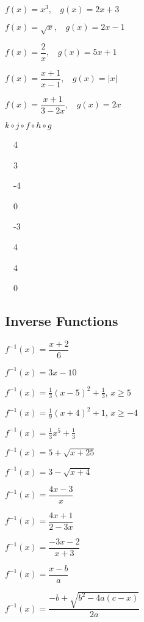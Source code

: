 \documentclass[12pt]{book}
\theoremstyle{definition}
\begin{document}
\begin{oddenumerate}
\begin{multicols}{2}
\item $f(x)=x^3,~~~~g(x)=2x+3$
\item $f(x)=\sqrt{x},~~~~g(x)=2x-1$
\item $f(x)=\dfrac{2}{x},~~~~g(x)=5x+1$
\item $f(x)=\dfrac{x+1}{x-1},~~~~g(x)=|x|$
\item $f(x)=\dfrac{x+1}{3-2x},~~~~g(x)=2x$
\item $k\circ j\circ f\circ h\circ g$
\end{multicols}
\begin{multicols}{4}
\item~~4
\item~~3
\item~~-4
\item~~0
\item~~-3
\item~~4
\item~~4
\item~~0
\end{multicols}
\end{oddenumerate}
\newpage
\subsection*{Inverse Functions}

\begin{oddenumerate}
\begin{multicols}{2}
\item $f^{-1}(x) = \dfrac{x + 2}{6}$
\item $f^{-1}(x) = 3x-10$
\item $f^{-1}(x) = \frac{1}{3}(x-5)^2+\frac{1}{3}$, $x \geq 5$
\item $f^{-1}(x) = \frac{1}{9}(x+4)^2+1$, $x \geq -4$
\item $f^{-1}(x) = \frac{1}{3} x^{5} + \frac{1}{3}$
\item $f^{-1}(x) = 5 + \sqrt{x+25}$
\item $f^{-1}(x) = 3 - \sqrt{x+4}$
\item $f^{-1}(x) = \dfrac{4x-3}{x}$
\item $f^{-1}(x) = \dfrac{4x+1}{2-3x}$
\item $f^{-1}(x) = \dfrac{-3x - 2}{x + 3}$
\item $f^{-1}(x)=\dfrac{x-b}{a}$
\item $f^{-1}(x)=\dfrac{-b+\sqrt{b^2-4a(c-x)}}{2a}$
\end{multicols}
\end{oddenumerate}
\end{document}
